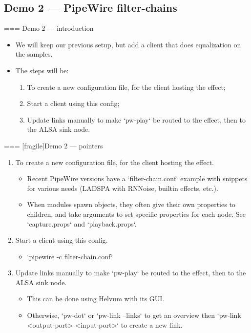\subsection{Demo 2 — PipeWire filter-chains}



=== {Demo 2 — introduction}
  \begin{itemize}

  \item We will keep our previous setup, but add a client that does
    equalization on the samples.

  \item The steps will be:

    \begin{enumerate}
    \item To create a new configuration file, for the client hosting the effect;
    \item Start a client using this config;
    \item Update links manually to make `pw-play` be routed to the
      effect, then to the ALSA sink node.
    \end{enumerate}

  \end{itemize}




=== [fragile]{Demo 2 — pointers}
  \begin{enumerate}

  \item To create a new configuration file, for the client hosting the effect.

    \begin{itemize}
    \item Recent PipeWire versions have a `filter-chain.conf`
      example with snippets for various needs (LADSPA with RNNoise,
      builtin effects, etc.).
    \item When modules spawn objects, they often give their own
      properties to children, and take arguments to set specific
      properties for each node. See `capture.props` and
      `playback.props`.
    \end{itemize}

  \item Start a client using this config.

    \begin{itemize}
    \item `pipewire -c filter-chain.conf`
    \end{itemize}

  \item Update links manually to make `pw-play` be routed to the
    effect, then to the ALSA sink node.

    \begin{itemize}
    \item This can be done using Helvum with its GUI.
    \item Otherwise,
      `pw-dot` or `pw-link --links` to get an overview then
      `pw-link <output-port> <input-port>` to create a new link.
    \end{itemize}

  \end{enumerate}




